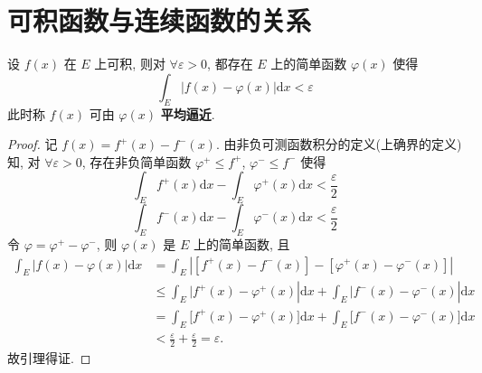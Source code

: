 \documentclass[../../main.tex]{subfiles}%
\begin{document}
\section{可积函数与连续函数的关系}

\begin{lemma}\label{lemma:引理4.3}
设 \( f(x) \) 在 \( E \) 上可积, 则对 \( \forall \varepsilon > 0 \), 都存在 \( E \) 上的简单函数 \( \varphi(x) \) 使得
\[
\int_E |f(x) - \varphi(x)|\mathrm{d}x < \varepsilon
\]
此时称 \( f(x) \) 可由 \( \varphi(x) \) \textbf{平均逼近}.
\end{lemma}
\begin{proof}

记 \( f(x) = f^+(x) - f^-(x) \). 由非负可测函数积分的定义(上确界的定义)知, 对 \( \forall \varepsilon > 0 \), 存在非负简单函数 \( \varphi^+ \leqslant f^+ \), \( \varphi^- \leqslant f^- \) 使得
\[
\int_E f^+(x)\mathrm{d}x - \int_E \varphi^+(x)\mathrm{d}x < \frac{\varepsilon}{2}
\]
\[
\int_E f^-(x)\mathrm{d}x - \int_E \varphi^-(x)\mathrm{d}x < \frac{\varepsilon}{2}
\]
令 \( \varphi = \varphi^+ - \varphi^- \), 则 \( \varphi(x) \) 是 \( E \) 上的简单函数, 且
\begin{align*}
\int_E{|f(x)}-\varphi (x)|\mathrm{d}x &=\int_E{\left| \left[ f^+\left( x \right) -f^-\left( x \right) \right] -\left[ \varphi ^+\left( x \right) -\varphi ^-\left( x \right) \right] \right|}
\\
&\leqslant \int_E{|f^+(x)}-\varphi ^+(x)|\mathrm{d}x +\int_E{|f^-(x)}-\varphi ^-(x)|\mathrm{d}x 
\\
&=\int_E{[f^+(x)}-\varphi ^+(x)]\mathrm{d}x +\int_E{[f^-(x)}-\varphi ^-(x)]\mathrm{d}x 
\\
&<\frac{\varepsilon}{2}+\frac{\varepsilon}{2}=\varepsilon .
\end{align*}
故引理得证.

\end{proof}
\end{document}
